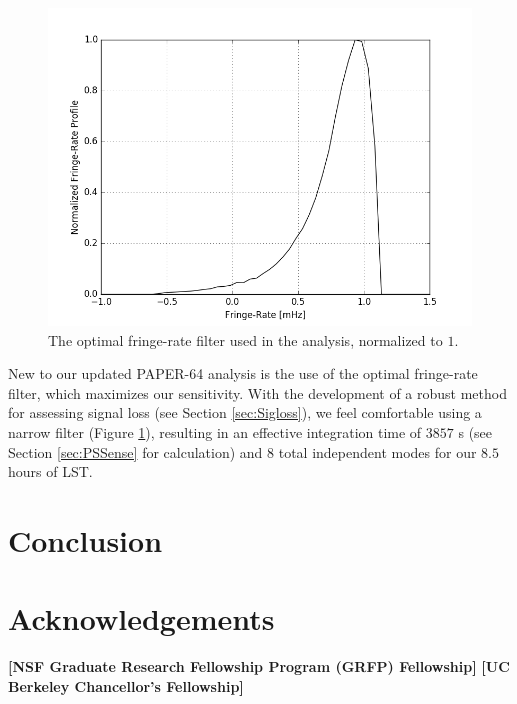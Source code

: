 \documentclass[preprint2,numberedappendix,tighten,twocolappendix]{aastex6}  %
\newcommand{\cc}[1]{{\color{purple} \textbf{[#1]}}}
\begin{document}
\begin{figure}
	\centering
	\includegraphics[width=\columnwidth]{plots/frp.png}
	\caption{The optimal fringe-rate filter used in the analysis, normalized to $1$.}
	\label{fig:frp}
\end{figure}

New to our updated PAPER-64 analysis is the use of the optimal fringe-rate filter, which maximizes our sensitivity. With the development of a robust method for assessing signal loss (see Section \ref{sec:Sigloss}), we feel comfortable using a narrow filter (Figure \ref{fig:frp}), resulting in an effective integration time of $3857$ s (see Section \ref{sec:PSSense} for calculation) and $8$ total independent modes for our $8.5$ hours of LST. 


\section{Conclusion}
\label{sec:Con}

\section{Acknowledgements}
\cc{NSF Graduate Research Fellowship Program (GRFP) Fellowship}
\cc{UC Berkeley Chancellor's Fellowship}
\label{sec:Ack}



\end{document}
